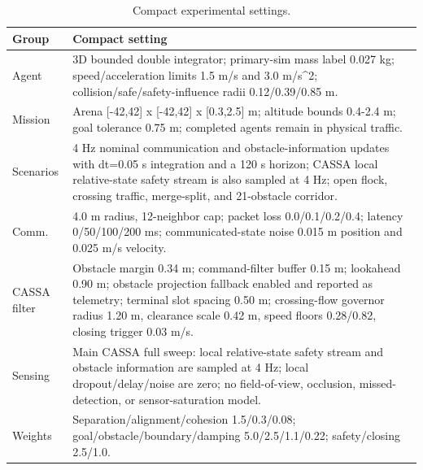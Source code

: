 \begin{table}[t]
\centering
\small
\caption{Compact experimental settings.}
\label{tab:parameter-summary}
\begin{tabular}{lp{}}
\toprule
Group & Compact setting \\
\midrule
Agent & 3D bounded double integrator; primary-sim mass label 0.027 kg; speed/acceleration limits 1.5 m/s and 3.0 m/s^2; collision/safe/safety-influence radii 0.12/0.39/0.85 m. \\
Mission & Arena [-42,42] x [-42,42] x [0.3,2.5] m; altitude bounds 0.4-2.4 m; goal tolerance 0.75 m; completed agents remain in physical traffic. \\
Scenarios & 4 Hz nominal communication and obstacle-information updates with dt=0.05 s integration and a 120 s horizon; CASSA local relative-state safety stream is also sampled at 4 Hz; open flock, crossing traffic, merge-split, and 21-obstacle corridor. \\
Comm. & 4.0 m radius, 12-neighbor cap; packet loss 0.0/0.1/0.2/0.4; latency 0/50/100/200 ms; communicated-state noise 0.015 m position and 0.025 m/s velocity. \\
CASSA filter & Obstacle margin 0.34 m; command-filter buffer 0.15 m; lookahead 0.90 m; obstacle projection fallback enabled and reported as telemetry; terminal slot spacing 0.50 m; crossing-flow governor radius 1.20 m, clearance scale 0.42 m, speed floors 0.28/0.82, closing trigger 0.03 m/s. \\
Sensing & Main CASSA full sweep: local relative-state safety stream and obstacle information are sampled at 4 Hz; local dropout/delay/noise are zero; no field-of-view, occlusion, missed-detection, or sensor-saturation model. \\
Weights & Separation/alignment/cohesion 1.5/0.3/0.08; goal/obstacle/boundary/damping 5.0/2.5/1.1/0.22; safety/closing 2.5/1.0. \\
\bottomrule
\end{tabular}
\end{table}
